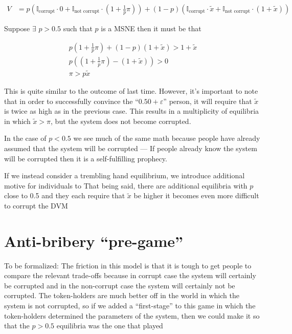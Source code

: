 \documentclass[12pt]{article}
\begin{document}
    \begin{align*}
      V &= p (\mathbb{I}_{\text{corrupt}} \cdot 0 + \mathbb{I}_{\text{not corrupt}} \cdot (1 + \frac{1}{p} \pi)) + (1 - p) (\mathbb{I}_{\text{corrupt}} \cdot \tilde{x} + \mathbb{I}_{\text{not corrupt}} \cdot (1 + \tilde{x}))
    \end{align*}

    Suppose $\exists$ $p > 0.5$ such that $p$ is a MSNE then it must be that

    \begin{align*}
      p (1 + \frac{1}{p} \pi) + (1 - p) (1 + \tilde{x}) > 1 + \tilde{x} \\
      p( (1 + \frac{1}{p} \pi) - (1 + \tilde{x})) > 0 \\
      \pi > p \tilde{x}
    \end{align*}

    This is quite similar to the outcome of last time. However, it's important to note that in
    order to successfully convince the ``$0.50 + \varepsilon$'' person, it will require that
    $\tilde{x}$ is twice as high as in the previous case. This results in a multiplicity of
    equilibria in which $\tilde{x} > \pi$, but the system does not become corrupted.

    In the case of $p < 0.5$ we see much of the same math because people have already assumed that
    the system will be corrupted --- If people already know the system will be corrupted then it
    is a self-fulfilling prophecy.

    If we instead consider a trembling hand equilibrium, we introduce additional motive for
    individuals to That being said, there are additional equilibria with $p$
    close to 0.5 and they each require that $\tilde{x}$ be higher it becomes even more difficult
    to corrupt the DVM



\section{Anti-bribery ``pre-game''}

  To be formalized: The friction in this model is that it is tough to get people to compare the
  relevant trade-offs because in corrupt case the system will certainly be corrupted and in the
  non-corrupt case the system will certainly not be corrupted. The token-holders are much better
  off in the world in which the system is not corrupted, so if we added a ``first-stage'' to this
  game in which the token-holders determined the parameters of the system, then we could make it
  so that the $p > 0.5$ equilibria was the one that played
\end{document}
